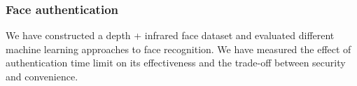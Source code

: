         \subsubsection*{Face authentication}
        We have constructed a depth + infrared face dataset and evaluated different
        machine learning approaches to face recognition. We have measured the
        effect of authentication time limit on its effectiveness and the trade-off
        between security and convenience.
